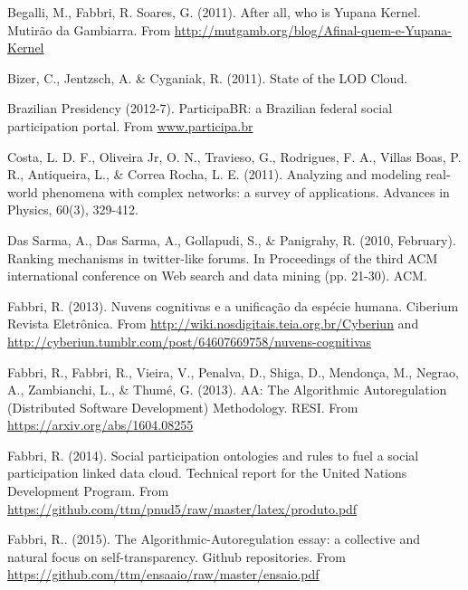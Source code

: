 \documentclass[12pt,fleqn]{article}
\begin{document}
\begin{thebibliography}{99}
\fontsize{11}{0}\selectfont
{}
	Begalli, M., Fabbri, R. Soares, G. (2011). After all, who is Yupana Kernel.
		Mutirão da Gambiarra. From \url{http://mutgamb.org/blog/Afinal-quem-e-Yupana-Kernel}

	Bizer, C., Jentzsch, A. \& Cyganiak, R. (2011). State of the LOD Cloud. 

Brazilian Presidency (2012-7). ParticipaBR: a Brazilian federal social participation portal. 
From \url{www.participa.br}

Costa, L. D. F., Oliveira Jr, O. N., Travieso, G., Rodrigues, F. A., Villas Boas, P. R., Antiqueira, L., \& Correa Rocha, L. E. (2011). Analyzing and modeling real-world phenomena with complex networks: a survey of applications. Advances in Physics, 60(3), 329-412.

Das Sarma, A., Das Sarma, A., Gollapudi, S., \& Panigrahy, R. (2010, February). Ranking mechanisms in twitter-like forums. In Proceedings of the third ACM international conference on Web search and data mining (pp. 21-30). ACM.

	Fabbri, R. (2013). Nuvens cognitivas e a unificação da espécie humana.
	Ciberium Revista Eletrônica.
	From \url{http://wiki.nosdigitais.teia.org.br/Cyberiun}
	and \url{http://cyberiun.tumblr.com/post/64607669758/nuvens-cognitivas}

	Fabbri, R., Fabbri, R., Vieira, V., Penalva, D., Shiga, D., Mendonça, M., Negrao, A., Zambianchi, L., \& Thumé, G. (2013). AA: The Algorithmic Autoregulation (Distributed Software Development) Methodology. RESI. From \url{https://arxiv.org/abs/1604.08255}

Fabbri, R. (2014). Social participation ontologies and rules to fuel a social participation linked data cloud.
	Technical report for the United Nations Development Program.
		From \url{https://github.com/ttm/pnud5/raw/master/latex/produto.pdf}

	Fabbri, R.. (2015). The Algorithmic-Autoregulation essay: a collective and natural focus
		on self-transparency. Github repositories. From \url{https://github.com/ttm/ensaaio/raw/master/ensaio.pdf}


\end{thebibliography}
\end{document}
